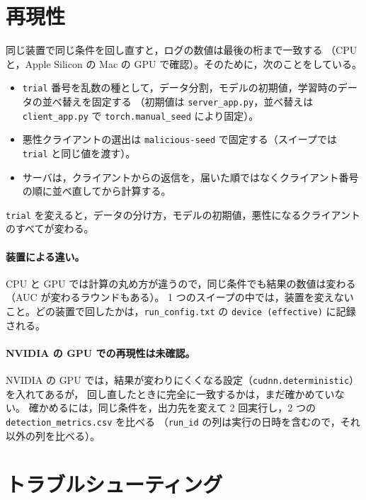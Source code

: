 \documentclass[a4j, dvipdfmx]{jsarticle}  %
\begin{document}
\section{再現性}

同じ装置で同じ条件を回し直すと，ログの数値は最後の桁まで一致する
（CPU と，Apple Silicon の Mac の GPU で確認）。そのために，次のことをしている。

\begin{itemize}
  \item \texttt{trial} 番号を乱数の種として，データ分割，モデルの初期値，学習時のデータの並べ替えを固定する
        （初期値は \texttt{server\_app.py}，並べ替えは \texttt{client\_app.py} で \texttt{torch.manual\_seed} により固定）。
  \item 悪性クライアントの選出は \texttt{malicious-seed} で固定する（スイープでは \texttt{trial} と同じ値を渡す）。
  \item サーバは，クライアントからの返信を，届いた順ではなくクライアント番号の順に並べ直してから計算する。
\end{itemize}

\texttt{trial} を変えると，データの分け方，モデルの初期値，悪性になるクライアントのすべてが変わる。

\paragraph{装置による違い。}
CPU と GPU では計算の丸め方が違うので，同じ条件でも結果の数値は変わる（AUC が変わるラウンドもある）。
1 つのスイープの中では，装置を変えないこと。どの装置で回したかは，\texttt{run\_config.txt} の \texttt{device (effective)} に記録される。

\paragraph{NVIDIA の GPU での再現性は未確認。}
NVIDIA の GPU では，結果が変わりにくくなる設定（\texttt{cudnn.deterministic}）を入れてあるが，
回し直したときに完全に一致するかは，まだ確かめていない。
確かめるには，同じ条件を，出力先を変えて 2 回実行し，2 つの \texttt{detection\_metrics.csv} を比べる
（\texttt{run\_id} の列は実行の日時を含むので，それ以外の列を比べる）。

\section{トラブルシューティング}
\end{document}
